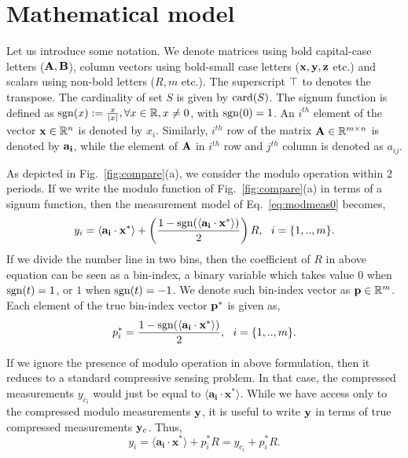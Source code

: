 \section{Mathematical model}
\label{sec:model}
Let us introduce some notation. We denote matrices using bold capital-case letters ($\mathbf{A,B}$), column vectors using bold-small case letters ($\mathbf{x,y,z}$ etc.) and scalars using non-bold letters ($R,m$ etc.). The superscript $\top$ to denotes the transpose. The cardinality of set $S$ is given by $\mathrm{card}(S)$. The signum function is defined as $\mathrm{sgn}(x) := \frac{x}{|x|}, \forall x \in {\mathbb{R}}, x \neq 0$, with $\mathrm{sgn}(0)=1$. An $i^{th}$ element of the vector $\mathbf{x} \in {\mathbb{R}}^n$ is denoted by $x_{i}$. Similarly, $i^{th}$ row of the matrix $\mathbf{A} \in {\mathbb{R}}^{m \times n}$ is denoted by $\mathbf{a_i}$, while the element of $\mathbf{A}$ in $i^{th}$ row and $j^{th}$ column is denoted as $a_{ij}$.

As depicted in Fig.~\ref{fig:compare}(a), we consider the modulo operation within 2 periods.
If we write the modulo function of Fig.~\ref{fig:compare}(a) in terms of a signum function, then the measurement model of Eq.~\ref{eq:modmeas0} becomes, 
\begin{equation}
y_i= \langle \mathbf{a_i} \cdot \mathbf{x^*} \rangle+\left( \frac{1-\mathrm{sgn}(\langle \mathbf{a_i} \cdot \mathbf{x^*} \rangle)}{2}\right)R,~~i = \{1,..,m\}.
\label{eq:modmeas2}
\end{equation} 
If we divide the number line in two bins, then the coefficient of $R$ in above equation can be seen as a bin-index, a binary variable which takes value $0$ when $\mathrm{sgn}(t)=1$, or $1$ when $\mathrm{sgn}(t)=-1$. We denote such bin-index vector as $\mathbf{p} \in {\mathbb{R}}^m$. Each element of the true bin-index vector $\mathbf{p}^*$ is given as,
$$
p^*_i = \frac{1-\mathrm{sgn}(\langle \mathbf{a_i} \cdot \mathbf{x^*} \rangle)}{2},~~i = \{1,..,m\}.
$$

If we ignore the presence of modulo operation in above formulation, then it reduces to a standard compressive sensing problem. In that case, the compressed measurements $y_{c_i}$ would just be equal to $\langle \mathbf{a_i} \cdot \mathbf{x^*} \rangle$. While we have access only to the compressed modulo measurements $\mathbf{y}$, it is useful to write $\mathbf{y}$ in terms of true compressed measurements $\mathbf{y}_c$. Thus,
$$
y_i = \langle \mathbf{a_i} \cdot \mathbf{x^*} \rangle + p^*_iR = y_{c_i}+p^*_iR.
$$

